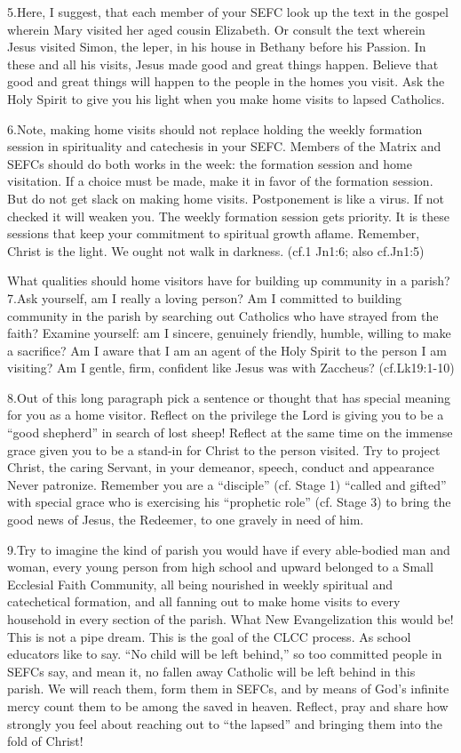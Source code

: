 \documentclass[oneside]{book}
\begin{document}
5.Here, I suggest, that each member of your SEFC look up the text in the gospel
wherein Mary visited her aged cousin Elizabeth. Or consult the text wherein
Jesus visited Simon, the leper, in his house in Bethany before his Passion. In
these and all his visits, Jesus made good and great things happen. Believe that
good and great things will happen to the people in the homes you visit. Ask the
Holy Spirit to give you his light when you make home visits to lapsed Catholics.

6.Note, making home visits should not replace holding the weekly formation
session in spirituality and catechesis in your SEFC. Members of the Matrix and
SEFCs should do both works in the week: the formation session and home
visitation. If a choice must be made, make it in favor of the formation
session. But do not get slack on making home visits. Postponement is like a
virus. If not checked it will weaken you. The weekly formation session gets
priority. It is these sessions that keep your commitment to spiritual growth
aflame. Remember, Christ is the light. We ought not walk in darkness. (cf.1
Jn1:6; also cf.Jn1:5)


What qualities should home visitors have for building up
   community in a parish?
7.Ask yourself, am I really a loving person? Am I committed to building
community in the parish by searching out Catholics who have strayed from the
faith? Examine yourself: am I sincere, genuinely friendly, humble, willing to
make a sacrifice? Am I aware that I am an agent of the Holy Spirit to the person
I am visiting? Am I gentle, firm, confident like Jesus was with Zaccheus?
(cf.Lk19:1-10)

8.Out of this long paragraph pick a sentence or thought that has special meaning
for you as a home visitor. Reflect on the privilege the Lord is giving you to be
a ``good shepherd'' in search of lost sheep! Reflect at the same time on the
immense grace given you to be a stand-in for Christ to the person visited. Try
to project Christ, the caring Servant, in your demeanor, speech, conduct and
appearance Never patronize. Remember you are a ``disciple'' (cf. Stage 1)
``called and gifted'' with special grace who is exercising his ``prophetic
role'' (cf. Stage 3) to bring the good news of Jesus, the Redeemer, to one
gravely in need of him.

9.Try to imagine the kind of parish you would have if every able-bodied man and
woman, every young person from high school and upward belonged to a Small
Ecclesial Faith Community, all being nourished in weekly spiritual and
catechetical formation, and all fanning out to make home visits to every
household in every section of the parish. What New Evangelization this would be!
This is not a pipe dream. This is the goal of the CLCC process.
As school educators like to say. ``No child will be left behind,'' so too
committed people in SEFCs say, and mean it, no fallen away Catholic will be left
behind in this parish. We will reach them, form them in SEFCs, and by means of
God's infinite mercy count them to be among the saved in heaven. Reflect, pray
and share how strongly you feel about reaching out to ``the lapsed'' and
bringing them into the fold of Christ!
\end{document}
